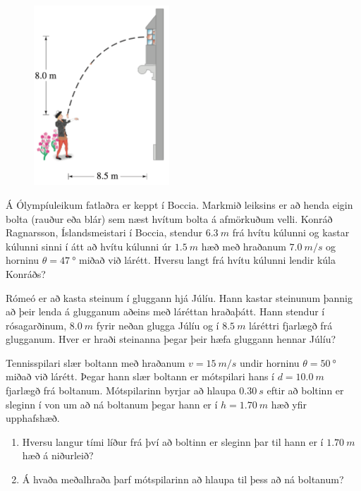 \begin{enumerate}[label = \textbf{Dæmi \thechapter.\arabic*.}]
\newpage


\begin{minipage}{\linewidth}
\begin{figure}
\vspace{-0.5cm}
\includegraphics[width=2in]{images/romeo.png}
\end{figure}

\item Á Ólympíuleikum fatlaðra er keppt í Boccia. Markmið leiksins er að henda eigin bolta (rauður eða blár) sem næst hvítum bolta á afmörkuðum velli. Konráð Ragnarsson, Íslandsmeistari í Boccia, stendur $\SI{6.3}{m}$ frá hvítu kúlunni og kastar kúlunni sinni í átt að hvítu kúlunni úr $\SI{1.5}{m}$ hæð með hraðanum $\SI{7.0}{m/s}$ og horninu $\theta = \SI{47}{\degree}$ miðað við lárétt. Hversu langt frá hvítu kúlunni lendir kúla Konráðs?

\item Rómeó er að kasta steinum í gluggann hjá Júlíu. Hann kastar steinunum þannig að þeir lenda á glugganum aðeins með láréttan hraðaþátt. Hann stendur í rósagarðinum, $\SI{8.0}{m}$ fyrir neðan glugga Júlíu og í $\SI{8.5}{m}$ láréttri fjarlægð frá glugganum. Hver er hraði steinanna þegar þeir hæfa gluggann hennar Júlíu?

\item Tennisspilari slær boltann með hraðanum $v = \SI{15}{m/s}$ undir horninu $\theta = \SI{50}{\degree}$ miðað við lárétt. Þegar hann slær boltann er mótspilari hans í $d = \SI{10.0}{m}$ fjarlægð frá boltanum. Mótspilarinn byrjar að hlaupa $\SI{0.30}{s}$ eftir að boltinn er sleginn í von um að ná boltanum þegar hann er í $h = \SI{1.70}{m}$ hæð yfir upphafshæð.
\begin{enumerate}[label = \textbf{(\alph*)}]
    \item Hversu langur tími líður frá því að boltinn er sleginn þar til hann er í $\SI{1.70}{m}$ hæð á niðurleið?
    \item Á hvaða meðalhraða þarf mótspilarinn að hlaupa til þess að ná boltanum?
\end{enumerate}


\end{minipage}
\end{enumerate}
